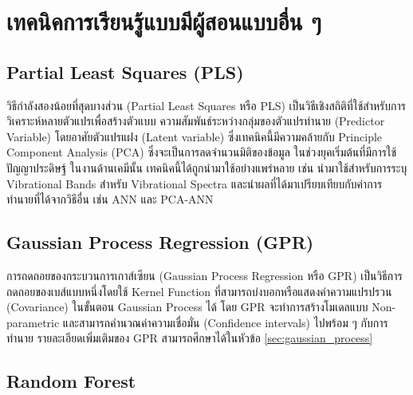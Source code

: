 \section{เทคนิคการเรียนรู้แบบมีผู้สอนแบบอื่น ๆ}
\label{sec:other_ml}

\subsection{Partial Least Squares (PLS)}
\label{ssec:pls}

วิธีกำลังสองน้อยที่สุดบางส่วน (Partial Least Squares หรือ PLS) เป็นวิธีเชิงสถิติที่ใช้สำหรับการวิเคราะห์หลายตัวแปรเพื่อสร้างตัวแบบ%
ความสัมพันธ์ระหว่างกลุ่มของตัวแปรทำนาย (Predictor Variable) โดยอาศัยตัวแปรแฝง (Latent variable) ซึ่งเทคนิคนี้มีความคล้ายกับ 
Principle Component Analysis (PCA) ซึ่งจะเป็นการลดจำนวนมิติของข้อมูล\autocite{wold1984} ในช่วงยุคเริ่มต้นที่มีการใช้ปัญญาประดิษฐ์%
ในงานด้านเคมีนั้น เทคนิคนี้ได้ถูกนำมาใช้อย่างแพร่หลาย เช่น นำมาใช้สำหรับการระบุ Vibrational Bands สำหรับ Vibrational Spectra 
และนำผลที่ได้มาเปรียบเทียบกับค่าการทำนายที่ได้จากวิธีอื่น เช่น ANN และ PCA-ANN

\subsection{Gaussian Process Regression (GPR)}
\label{ssec:gpr}

การถดถอยของกระบวนการเกาส์เซียน (Gaussian Process Regression หรือ GPR) เป็นวิธีการถดถอยของเบส์แบบหนึ่งโดยใช้ Kernel Function 
ที่สามารถบ่งบอกหรือแสดงค่าความแปรปรวน (Covariance) ในขั้นตอน Gaussian Process ได้\autocite{rasmussen2005} โดย GPR 
จะทำการสร้างโมเดลแบบ Non-parametric และสามารถคำนวณค่าความเชื่อมั่น (Confidence intervals) ไปพร้อม ๆ กับการทำนาย 
รายละเอียดเพิ่มเติมของ GPR สามารถศึกษาได้ในหัวข้อ \ref{sec:gaussian_process}

\subsection{Random Forest}
\label{ssec:rs}

